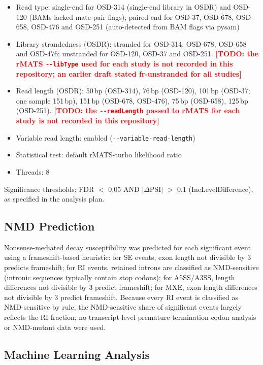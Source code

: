 \documentclass[12pt,a4paper]{article}
\newcommand{\TODO}[1]{\textcolor{red}{\textbf{[TODO: #1]}}}
\begin{document}
\begin{itemize}
\item Read type: single-end for OSD-314 (single-end library in OSDR) and OSD-120 (BAMs lacked mate-pair flags); paired-end for OSD-37, OSD-678, OSD-658, OSD-476 and OSD-251 (auto-detected from BAM flags via pysam)
\item Library strandedness (OSDR): stranded for OSD-314, OSD-678, OSD-658 and OSD-476; unstranded for OSD-120, OSD-37 and OSD-251. \TODO{the rMATS \texttt{-{}-libType} used for each study is not recorded in this repository; an earlier draft stated fr-unstranded for all studies}
\item Read length (OSDR): 50\,bp (OSD-314), 76\,bp (OSD-120), 101\,bp (OSD-37; one sample 151\,bp), 151\,bp (OSD-678, OSD-476), 75\,bp (OSD-658), 125\,bp (OSD-251). \TODO{the \texttt{-{}-readLength} passed to rMATS for each study is not recorded in this repository}
\item Variable read length: enabled (\texttt{-{}-variable-read-length})
\item Statistical test: default rMATS-turbo likelihood ratio
\item Threads: 8
\end{itemize}

Significance thresholds: FDR $<$ 0.05 AND $|\Delta\text{PSI}|$ $>$ 0.1 (IncLevelDifference), as specified in the analysis plan.

\subsection{NMD Prediction}

Nonsense-mediated decay susceptibility was predicted for each significant event using a frameshift-based heuristic: for SE events, exon length not divisible by 3 predicts frameshift; for RI events, retained introns are classified as NMD-sensitive (intronic sequences typically contain stop codons); for A5SS/A3SS, length differences not divisible by 3 predict frameshift; for MXE, exon length differences not divisible by 3 predict frameshift. Because every RI event is classified as NMD-sensitive by rule, the NMD-sensitive share of significant events largely reflects the RI fraction; no transcript-level premature-termination-codon analysis or NMD-mutant data were used.

\subsection{Machine Learning Analysis}
\end{document}

